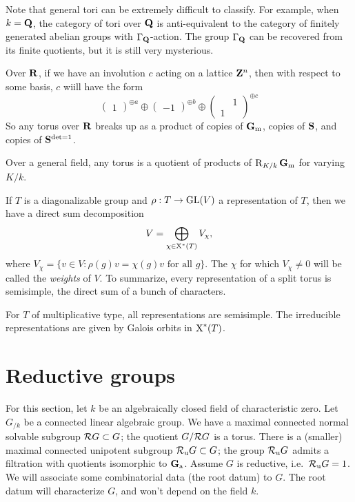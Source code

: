 Note that general tori can be extremely difficult to classify. For example, 
when $k=\mathbf{Q}$, the category of tori over $\mathbf{Q}$ is anti-equivalent to the 
category of finitely generated abelian groups with $\Gamma_{\mathbf{Q}}$-action. The 
group $\Gamma_{\mathbf{Q}}$ can be recovered from its finite quotients, but it is 
still very mysterious. 

\begin{example}
Over $\mathbf{R}$, if we have an involution $c$ acting on a lattice $\mathbf{Z}^n$, then 
with respect to some basis, $c$ wiill have the form 
\[
  \begin{pmatrix} 1 \end{pmatrix}^{\oplus a} \oplus\begin{pmatrix} -1 \end{pmatrix}^{\oplus b} \oplus\begin{pmatrix} & 1 \\ 1 \end{pmatrix}^{\oplus c}
\]
So any torus over $\mathbf{R}$ breaks up as a product of copies of $\mathbf{G}_\mathrm{m}$, copies of 
$\mathbf{S}$, and copies of $\mathbf{S}^{\det=1}$. 
\end{example}

Over a general field, any torus is a quotient of products of 
$\operatorname{R}_{K/k}\mathbf{G}_\mathrm{m}$ for varying $K/k$. 

If $T$ is a diagonalizable group and $\rho:T\to \operatorname{GL}(V)$ a representation of 
$T$, then we have a direct sum decomposition 
\[
  V=\bigoplus_{\chi\in \operatorname{X}^\ast(T)} V_\chi ,
\]
where $V_\chi=\{v\in V:\rho(g)v = \chi(g) v\text{ for all }g\}$. The 
$\chi$ for which $V_\chi\ne 0$ will be called the \emph{weights} of $V$. To 
summarize, every representation of a split torus is semisimple, the direct 
sum of a bunch of characters. 

For $T$ of multiplicative type, all representations are semisimple. The 
irreducible representations are given by Galois orbits in 
$\operatorname{X}^\ast(T)$. 










\section{Reductive groups}

For this section, let $k$ be an algebraically closed field of characteristic 
zero. Let $G_{/k}$ be a connected linear algebraic group. We have a 
maximal connected normal solvable subgroup $\mathcal{R} G\subset G$; the quotient 
$G/\mathcal{R} G$ is a torus. There is a (smaller) maximal connected unipotent 
subgroup $\mathcal{R}_\mathrm{u} G\subset G$; the group $\mathcal{R}_\mathrm{u} G$ admits a filtration 
with quotients isomorphic to $\mathbf{G}_\mathrm{a}$. Assume $G$ is reductive, 
i.e.~$\mathcal{R}_\mathrm{u} G=1$. We will associate some combinatorial data (the root 
datum) to $G$. The root datum will characterize $G$, and won't depend on the 
field $k$. 





